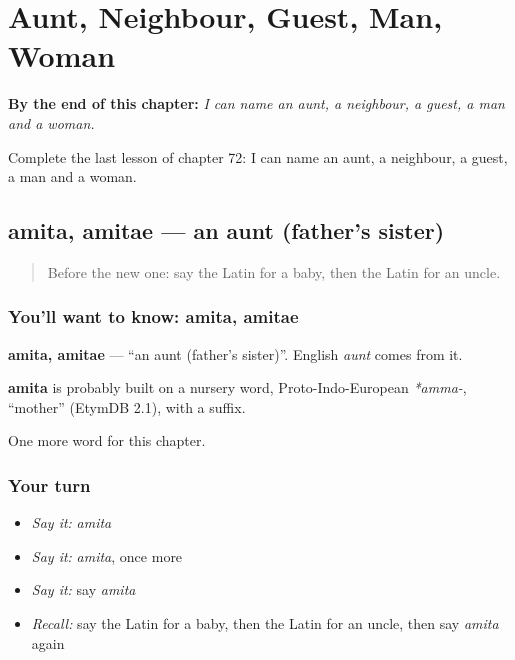 
\chapter{Aunt, Neighbour, Guest, Man, Woman}
\label{ch:la-aunt-neighbour-guest-man-woman}

\begin{chapteropening}
\textbf{By the end of this chapter:} \emph{I can name an aunt, a neighbour, a guest, a man and a woman.}

Complete the last lesson of chapter 72: I can name an aunt, a neighbour, a guest, a man and a woman.
\end{chapteropening}

\section[amita, amitae]{amita, amitae — an aunt (father's sister)}

\label{lesson:LA-C72-amita}



\begin{quote}
Before the new one: say the Latin for a baby, then the Latin for an uncle.
\end{quote}

\subsection*{You'll want to know: amita, amitae}
\textbf{amita, amitae} — \textquotedblleft{}an aunt (father's sister)\textquotedblright{}. English \emph{aunt} comes from it.

\begin{cousinweb}
\textbf{amita} is probably built on a nursery word, Proto-Indo-European \emph{*amma-}, \textquotedblleft{}mother\textquotedblright{} (EtymDB 2.1), with a suffix.
\end{cousinweb}

\begin{grammarlens}[title={What you've built}]
One more word for this chapter.
\end{grammarlens}

\subsection*{Your turn}
\begin{itemize}
\raggedright
  \item \emph{Say it:} \emph{amita}
  \item \emph{Say it:} \emph{amita}, once more
  \item \emph{Say it:} say \emph{amita}
  \item \emph{Recall:} say the Latin for a baby, then the Latin for an uncle, then say \emph{amita} again
\end{itemize}

